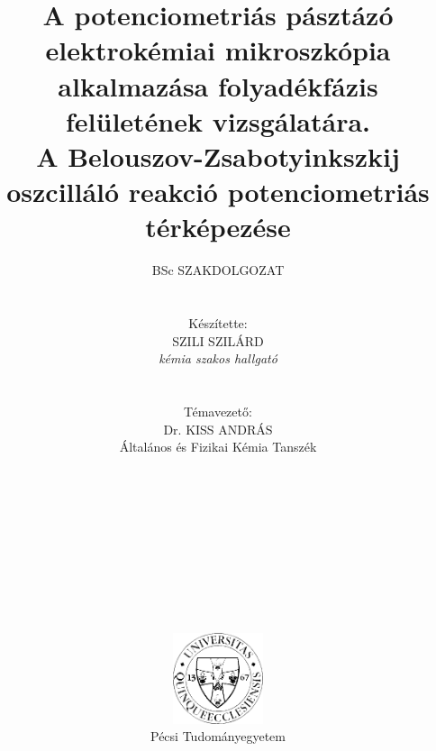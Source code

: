 \pagestyle{empty}

\title{\textbf{A potenciometriás pásztázó elektrokémiai mikroszkópia alkalmazása folyadékfázis felületének vizsgálatára.\\A Belouszov-Zsabotyinkszkij oszcilláló reakció potenciometriás térképezése}}

\author{BSc SZAKDOLGOZAT\\
\\ \\ Készítette:\\ 
SZILI SZILÁRD \\
\emph{kémia szakos hallgató}\\
\\ \\
Témavezető: \\
Dr. KISS ANDRÁS \\
 Általános és Fizikai Kémia Tanszék \\
\\ \\ \\ \\ \\ \\ \\ \\ \\ \\
\includegraphics[width=0.2\textwidth]{img/pte_logo.eps} \\
Pécsi Tudományegyetem}
\maketitle
\pagestyle{plain}

\large
\setcounter{tocdepth}{4}
\tableofcontents
